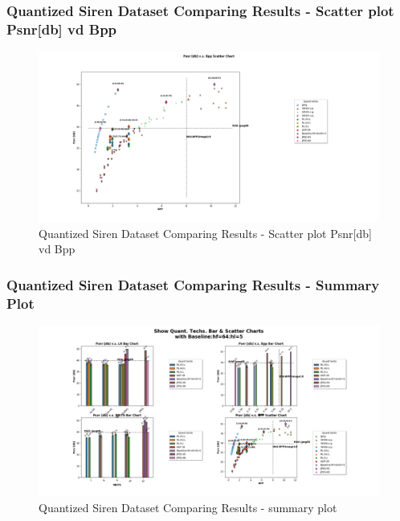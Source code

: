 \begin{frame}
\frametitle{Quantized Siren Dataset Comparing Results -  Scatter plot Psnr[db] vd Bpp}


\begin{figure}
\includegraphics[scale=0.27]{slides/experiments/quant_dataset/scatter_psnr_bpp.png}
\caption{Quantized Siren Dataset Comparing Results -  Scatter plot Psnr[db] vd Bpp}
\end{figure}

\end{frame}

\begin{frame}
\frametitle{Quantized Siren Dataset Comparing Results -  Summary Plot}


\begin{figure}
\includegraphics[scale=0.27]{slides/experiments/quant_dataset/chart_3bars_1scatter_v2.png}
\caption{Quantized Siren Dataset Comparing Results -  summary plot}
\end{figure}

\end{frame}